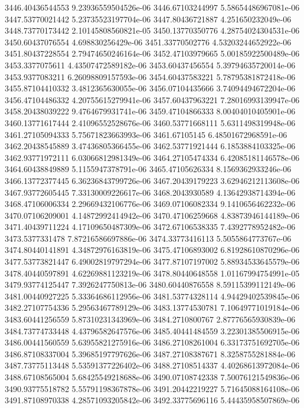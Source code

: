 {3446.40436544553 9.23936559504526e-06
3446.67103244997 5.58654486967081e-06
3447.53770021442 5.23735523197704e-06
3447.80436721887 4.251650232049e-06
3448.73770173442 2.10145808560821e-05
3450.13770350776 4.28754024304531e-06
3450.60437076554 4.698830256429e-06
3451.33770502776 4.53203244652922e-06
3451.80437228554 2.79474650246164e-06
3452.47103979665 5.00185922500489e-06
3453.3377075611 4.43507472589182e-06
3453.60437456554 5.39794635720014e-06
3453.9377083211 6.26098809157593e-06
3454.60437583221 5.78795381872418e-06
3455.87104410332 3.4812365630055e-06
3456.07104435666 3.74094494672204e-06
3456.47104486332 4.20755615279941e-06
3457.60437963221 7.28016993139947e-06
3458.20438039222 9.4764679931741e-06
3459.47104866333 8.00404010405901e-06
3460.13771617444 2.41096552528676e-06
3460.53771668111 5.6311498319948e-06
3461.27105094333 5.75671823663993e-06
3461.67105145 6.48501672968591e-06
3462.20438545889 3.47436805366455e-06
3462.53771921444 6.1853884103325e-06
3462.93771972111 6.03066812981349e-06
3464.27105474334 6.42085181146578e-06
3464.60438849889 5.1155947378791e-06
3465.47105626334 8.1569362933246e-06
3466.13772377445 6.36236843799726e-06
3467.20439179223 3.62946212113608e-06
3467.93772605445 7.33130009226617e-06
3468.2043930589 4.13642938714394e-06
3468.47106006334 2.29669432106776e-06
3469.07106082334 9.1410656462232e-06
3470.07106209001 4.14872992414942e-06
3470.47106259668 4.83873946144189e-06
3471.40439711224 4.17109650487309e-06
3472.67106538335 7.4392778952482e-06
3473.5377331478 7.87216586697886e-06
3474.33773416113 5.5055864773767e-06
3474.80440141891 4.34872976163819e-06
3475.47106893002 6.81928610870296e-06
3477.53773821447 6.49002819797294e-06
3477.87107197002 5.88934533645579e-06
3478.40440597891 4.62269881123219e-06
3478.80440648558 1.01167994754991e-05
3479.93774125447 7.3926247750813e-06
3480.60440876558 8.59115399112149e-06
3481.00440927225 5.33364686112956e-06
3481.53774328114 4.94429402539845e-06
3482.27107754336 5.29563467789129e-06
3483.13774530781 7.10649771019184e-06
3483.60441256559 5.87310231343969e-06
3484.2710800767 2.87776565930839e-06
3484.73774733448 4.43796582647576e-06
3485.40441484559 3.22301385506915e-06
3486.00441560559 5.63955821275916e-06
3486.27108261004 6.33173751692705e-06
3486.87108337004 5.39685197797626e-06
3487.27108387671 8.3258755281884e-06
3487.73775113448 5.53591377226402e-06
3488.27108514337 4.40268613972084e-06
3488.67108565004 5.68425549218688e-06
3490.07108742338 7.50076121549836e-06
3490.93775518782 5.55791198367878e-06
3491.20442219227 5.71645088164108e-06
3491.87108970338 4.28571093205842e-06
3492.33775696116 5.44435958507869e-06
}
